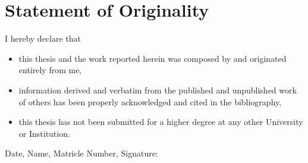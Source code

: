 
\section*{Statement of Originality}I hereby declare that 
\begin{itemize}
\item this thesis and the work reported herein was composed by and originated entirely from me,
\item information derived and verbatim from the published and unpublished work of others has been properly acknowledged and cited in the bibliography,
\item this thesis has not been submitted for a higher degree at any other University or Institution.
\end{itemize}

Date, Name, Matricle Number, Signature:

